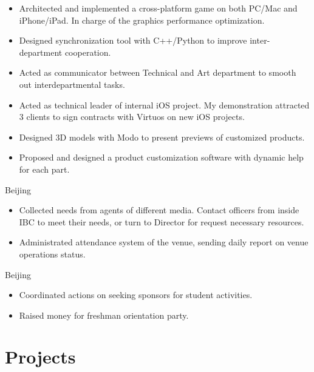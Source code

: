 \documentclass[10pt,a4paper]{moderncv/moderncv}
\begin{document}
{
\begin{itemize}
	\item Architected and implemented a cross-platform game on both PC/Mac and iPhone/iPad. In charge of the graphics performance optimization.
	\item Designed synchronization tool with C++/Python to improve inter-department cooperation.
	\item Acted as communicator between Technical and Art department to smooth out interdepartmental tasks.
	\item Acted as technical leader of internal iOS project. My demonstration attracted 3 clients to sign contracts with Virtuos on new iOS projects.
\end{itemize}
}

{
\begin{itemize}
	\item Designed 3D models with Modo to present previews of customized products.
	\item Proposed and designed a product customization software with dynamic help for each part.
\end{itemize}
}

{Beijing}{}
{
\begin{itemize}
	\item Collected needs from agents of different media. Contact officers from inside IBC to meet their needs, or turn to Director for request necessary resources.
	\item Administrated attendance system of the venue, sending daily report on venue operations status.
\end{itemize}
}

{Beijing}{}
{
\begin{itemize}
	\item Coordinated actions on seeking sponsors for student activities.
	\item Raised money for freshman orientation party.
\end{itemize}
}

\section{Projects}
\end{document}
